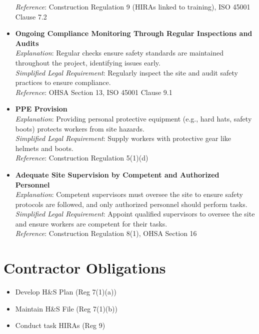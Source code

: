 \documentclass[11pt]{article}
\begin{document}
\begin{itemize}
    \textit{Reference}: Construction Regulation 9 (HIRAs linked to training), ISO 45001 Clause 7.2
  \item \textbf{Ongoing Compliance Monitoring Through Regular Inspections and Audits} \\
    \textit{Explanation}: Regular checks ensure safety standards are maintained throughout the project, identifying issues early. \\
    \textit{Simplified Legal Requirement}: Regularly inspect the site and audit safety practices to ensure compliance. \\
    \textit{Reference}: OHSA Section 13, ISO 45001 Clause 9.1
  \item \textbf{PPE Provision} \\
    \textit{Explanation}: Providing personal protective equipment (e.g., hard hats, safety boots) protects workers from site hazards. \\
    \textit{Simplified Legal Requirement}: Supply workers with protective gear like helmets and boots. \\
    \textit{Reference}: Construction Regulation 5(1)(d)
  \item \textbf{Adequate Site Supervision by Competent and Authorized Personnel} \\
    \textit{Explanation}: Competent supervisors must oversee the site to ensure safety protocols are followed, and only authorized personnel should perform tasks. \\
    \textit{Simplified Legal Requirement}: Appoint qualified supervisors to oversee the site and ensure workers are competent for their tasks. \\
    \textit{Reference}: Construction Regulation 8(1), OHSA Section 16
\end{itemize}

\section{Contractor Obligations}
\begin{itemize}
  \item Develop H\&S Plan (Reg 7(1)(a))
  \item Maintain H\&S File (Reg 7(1)(b))
  \item Conduct task HIRAs (Reg 9)
\end{itemize}

\end{document}
